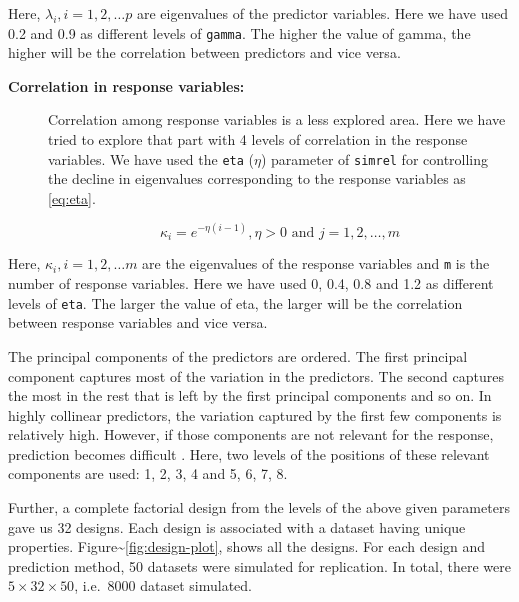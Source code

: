\documentclass[12pt,3p,authoryear]{elsarticle}
\providecommand{\tightlist}{%
  \setlength{\itemsep}{0pt}\setlength{\parskip}{0pt}}
\begin{document}
Here, \(\lambda_i, i = 1, 2, \ldots p\) are eigenvalues of the predictor
variables. Here we have used 0.2 and 0.9 as different levels of
\texttt{gamma}. The higher the value of gamma, the higher will be the
correlation between predictors and vice versa.

\begin{description}
\item[\textbf{Correlation in response variables:}]
Correlation among response variables is a less explored area. Here we
have tried to explore that part with 4 levels of correlation in the
response variables. We have used the \texttt{eta} (\(\eta\)) parameter
of \texttt{simrel} for controlling the decline in eigenvalues
corresponding to the response variables as \eqref{eq:eta}.

\begin{equation}
  \kappa_i = e^{-\eta(i - 1)}, \eta > 0 \text{ and } j = 1, 2, \ldots, m
  \label{eq:eta}
\end{equation}
\end{description}

Here, \(\kappa_i, i = 1, 2, \ldots m\) are the eigenvalues of the
response variables and \texttt{m} is the number of response variables.
Here we have used 0, 0.4, 0.8 and 1.2 as different levels of
\texttt{eta}. The larger the value of eta, the larger will be the
correlation between response variables and vice versa.

\begin{description}
\tightlist
\item[\textbf{Position of predictor components relevant to the
response:}]
The principal components of the predictors are ordered. The first
principal component captures most of the variation in the predictors.
The second captures the most in the rest that is left by the first
principal components and so on. In highly collinear predictors, the
variation captured by the first few components is relatively high.
However, if those components are not relevant for the response,
prediction becomes difficult \citep{Helland1994b}. Here, two levels of
the positions of these relevant components are used: 1, 2, 3, 4 and 5,
6, 7, 8.
\end{description}

Further, a complete factorial design from the levels of the above given
parameters gave us 32 designs. Each design is associated with a dataset
having unique properties. Figure\textasciitilde{}\ref{fig:design-plot},
shows all the designs. For each design and prediction method, 50
datasets were simulated for replication. In total, there were
\(5 \times 32 \times 50\), i.e.~8000 dataset simulated.
\end{document}
